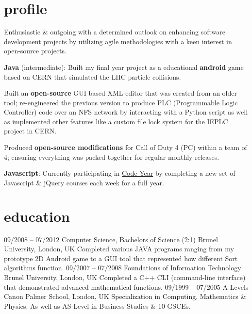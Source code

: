 \documentclass[]{friggeri-cv}
\begin{document}
\section{profile}

Enthusiastic \& outgoing with a determined outlook on enhancing software development projects by utilizing agile methodologies with a keen interest in open-source projects.

\textbf{Java} (intermediate): Built my final year project as a educational \textbf{android} game based on CERN that simulated the LHC particle collisions.

Built an \textbf{open-source} GUI based XML-editor that was created from an older tool; re-engineered the previous version to produce PLC (Programmable Logic Controller) code over an NFS network by interacting with a Python script as well as implemented other features like a custom file lock system for the IEPLC project in CERN.

Produced \textbf{open-source modifications} for Call of Duty 4 (PC) within a team of 4; ensuring everything was packed together for regular monthly releases.

\textbf{Javascript}: Currently participating in \href{http://codeyear.com}{Code Year} by completing a new set of Javascript \& jQuery courses each week for a full year.


\section{education}

\begin{entrylist}
  \entry
    {09/2008 – 07/2012}
    {Computer Science, Bachelors of Science (2:1)}
    {Brunel University, London, UK}
    {Completed various JAVA programs ranging from my prototype 2D Android game to a GUI tool that represented how different Sort algorithms function.}
  \entry
    {09/2007 – 07/2008}
    {Foundations of Information Technology}
    {Brunel University, London, UK}
    {Completed a C++ CLI (command-line interface) that demonstrated advanced mathematical functions.}
  \entry
    {09/1999 – 07/2005}
    {A-Levels}
    {Canon Palmer School, London, UK}
    {Specialization in Computing, Mathematics \& Physics. As well as AS-Level in Business Studies \& 10 GSCEs.}
\end{entrylist}
\end{document}
